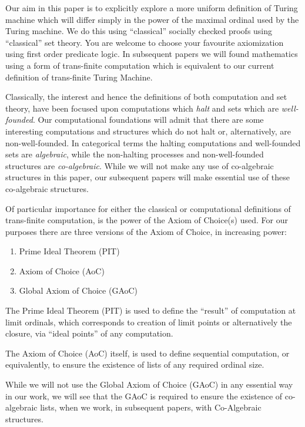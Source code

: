 \documentclass[a4paper,openany]{amsart}
\begin{document}

Our aim in this paper is to explicitly explore a more uniform definition of Turing machine
which will differ simply in the power of the maximal ordinal used by the Turing machine.
We do this using ``classical'' socially checked proofs using ``classical'' set theory. You
are welcome to choose your favourite axiomization using first order predicate logic. In
subsequent papers we will found mathematics using a form of trans-finite computation which
is equivalent to our current definition of trans-finite Turing Machine. 

Classically, the interest and hence the definitions of both computation and set theory,
have been focused upon computations which \emph{halt} and sets which are
\emph{well-founded}. Our computational foundations will admit that there are some
interesting computations and structures which do not halt or, alternatively, are
non-well-founded. In categorical terms the halting computations and well-founded sets are
\emph{algebraic}, while the non-halting processes and non-well-founded structures are
\emph{co-algebraic}. While we will not make any use of co-algebraic structures in this
paper, our subsequent papers will make essential use of these co-algebraic structures.

Of particular importance for either the classical or computational definitions of
trans-finite computation, is the power of the Axiom of Choice(s) used. For our purposes
there are three versions of the Axiom of Choice, in increasing power:
%
\begin{enumerate}
\item Prime Ideal Theorem (PIT)
\item Axiom of Choice (AoC)
\item Global Axiom of Choice (GAoC)
\end{enumerate}

The Prime Ideal Theorem (PIT) is used to define the ``result'' of computation at
limit ordinals, which corresponds to creation of limit points or alternatively
the closure, via ``ideal points'' of any computation.

The Axiom of Choice (AoC) itself, is used to define sequential computation, or
equivalently, to ensure the existence of lists of any required ordinal size.

While we will not use the Global Axiom of Choice (GAoC) in any essential way in
our work, we will see that the GAoC is required to ensure the existence of
co-algebraic lists, when we work, in subsequent papers, with Co-Algebraic
structures.
\end{document}
